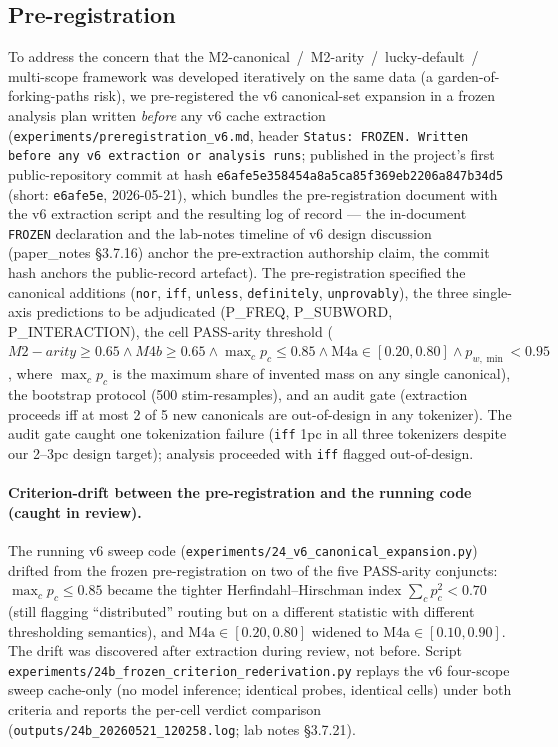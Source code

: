 \documentclass[11pt,letterpaper]{article}
\newcommand{\Mc}{M2-canonical}
\newcommand{\Ma}{M2-arity}
\newcommand{\Mbfb}{M4b}
\newcommand{\pwmin}{\ensuremath{p_{w,\min}}}
\begin{document}
\subsection{Pre-registration}
\label{sec:prereg}

To address the concern that the \Mc{}~/~\Ma{}~/~lucky-default~/~
multi-scope framework was developed iteratively on the same data
(a garden-of-forking-paths risk), we pre-registered the v6
canonical-set expansion in a frozen analysis plan written \emph{before}
any v6 cache extraction (\texttt{experiments/preregistration\_v6.md},
header \texttt{Status: FROZEN. Written before any v6 extraction or
analysis runs}; published in the project's first public-repository
commit at hash \texttt{e6afe5e358454a8a5ca85f369eb2206a847b34d5}
(short: \texttt{e6afe5e}, 2026-05-21), which bundles the
pre-registration document with the v6 extraction script and the
resulting log of record --- the in-document \texttt{FROZEN}
declaration and the lab-notes timeline of v6 design discussion
(paper\_notes \S3.7.16) anchor the pre-extraction authorship claim,
the commit hash anchors the public-record artefact). The
pre-registration specified the canonical additions (\texttt{nor},
\texttt{iff}, \texttt{unless}, \texttt{definitely}, \texttt{unprovably}),
the three single-axis predictions to be adjudicated (P\_FREQ,
P\_SUBWORD, P\_INTERACTION), the cell PASS-arity threshold
($\Ma \geq 0.65 \wedge \Mbfb \geq 0.65 \wedge \max_c p_c \leq 0.85
\wedge \text{M4a} \in [0.20, 0.80] \wedge \pwmin < 0.95$, where
$\max_c p_c$ is the maximum share of invented mass on any single
canonical), the bootstrap protocol (500 stim-resamples), and an
audit gate (extraction proceeds iff at most 2 of 5 new canonicals are
out-of-design in any tokenizer). The audit gate caught one
tokenization failure (\texttt{iff} 1pc in all three tokenizers
despite our 2--3pc design target); analysis proceeded with
\texttt{iff} flagged out-of-design.

\paragraph{Criterion-drift between the pre-registration and the
running code (caught in review).} The running v6 sweep code
(\texttt{experiments/24\_v6\_canonical\_expansion.py}) drifted from the
frozen pre-registration on two of the five PASS-arity conjuncts:
$\max_c p_c \leq 0.85$ became the tighter Herfindahl--Hirschman index
$\sum_c p_c^2 < 0.70$ (still flagging ``distributed'' routing but on a
different statistic with different thresholding semantics), and
$\text{M4a} \in [0.20, 0.80]$ widened to $\text{M4a} \in [0.10, 0.90]$.
The drift was discovered after extraction during review, not before.
Script
\texttt{experiments/24b\_frozen\_criterion\_rederivation.py} replays
the v6 four-scope sweep cache-only (no model inference; identical
probes, identical cells) under both criteria and reports the per-cell
verdict comparison (\texttt{outputs/24b\_20260521\_120258.log}; lab
notes \S3.7.21).
\end{document}
